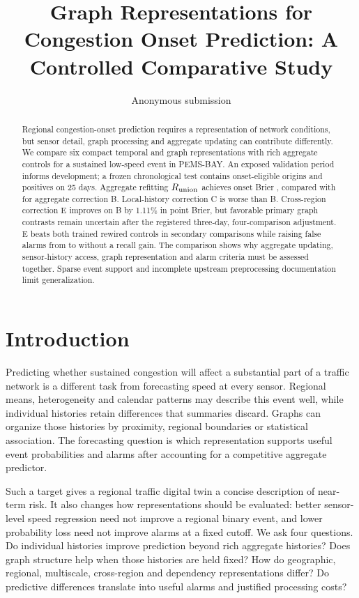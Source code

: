 \documentclass{llncs}
\begin{document}
\title{Graph Representations for Congestion Onset Prediction: A Controlled Comparative Study}
\author{Anonymous submission}
\institute{}
\maketitle
\begin{abstract}
Regional congestion-onset prediction requires a representation of network conditions, but sensor detail, graph processing and aggregate updating can contribute differently. We compare six compact temporal and graph representations with rich aggregate controls for a sustained low-speed event in PEMS-BAY. An exposed validation period informs development; a frozen chronological test contains \TestOnsetN{} onset-eligible origins and \TestPos{} positives on 25 days. Aggregate refitting $R_{\rm union}$ achieves onset Brier \TestOnRUnion{}, compared with \TestOnB{} for aggregate correction B. Local-history correction C is worse than B. Cross-region correction E improves on B by 1.11\% in point Brier, but favorable primary graph contrasts remain uncertain after the registered three-day, four-comparison adjustment. E beats both trained rewired controls in secondary comparisons while raising false alarms from \TestFprB{} to \TestFprE{} without a recall gain. The comparison shows why aggregate updating, sensor-history access, graph representation and alarm criteria must be assessed together. Sparse event support and incomplete upstream preprocessing documentation limit generalization.
\end{abstract}

\section{Introduction}
Predicting whether sustained congestion will affect a substantial part of a traffic network is a different task from forecasting speed at every sensor. Regional means, heterogeneity and calendar patterns may describe this event well, while individual histories retain differences that summaries discard. Graphs can organize those histories by proximity, regional boundaries or statistical association. The forecasting question is which representation supports useful event probabilities and alarms after accounting for a competitive aggregate predictor.

Such a target gives a regional traffic digital twin a concise description of near-term risk. It also changes how representations should be evaluated: better sensor-level speed regression need not improve a regional binary event, and lower probability loss need not improve alarms at a fixed cutoff. We ask four questions. Do individual histories improve prediction beyond rich aggregate histories? Does graph structure help when those histories are held fixed? How do geographic, regional, multiscale, cross-region and dependency representations differ? Do predictive differences translate into useful alarms and justified processing costs?
\end{document}
